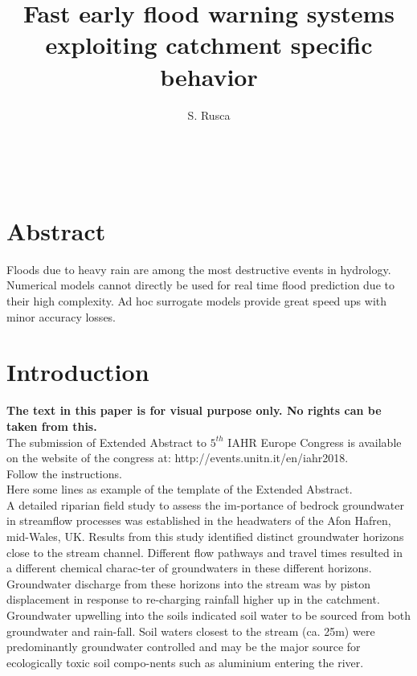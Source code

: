 \documentclass[12pt,a4paper,twocolumn,fleqn]{narms}
\begin{document}
\title{Fast early flood warning systems exploiting catchment specific behavior}
\author{{S. Rusca} \\
{} \\\\
{}\\
{}
} \maketitle


\section*{Abstract}

Floods due to heavy rain are among the most destructive events in hydrology. 
Numerical models cannot directly be used for real time flood prediction due to
their high complexity. Ad hoc surrogate models provide great speed
ups with minor accuracy losses.


\section{Introduction}

{\bf The text in this paper is for visual purpose only. No rights
can be taken from this.}\\

The submission of Extended Abstract to $5^{th}$ IAHR Europe Congress
is available on the website of the congress at: http://events.unitn.it/en/iahr2018.\\

Follow the instructions.\\

Here some lines as example of the template of the Extended Abstract.\\

A detailed riparian field study to assess the im-portance of
bedrock groundwater in streamflow processes was established in the
headwaters of the Afon Hafren, mid-Wales, UK. Results from this
study identified distinct groundwater horizons close to the stream
channel.  Different flow pathways and travel times resulted in a
different chemical charac-ter of groundwaters in these different
horizons.  Groundwater discharge from these horizons into the
stream was by piston displacement in response to re-charging
rainfall higher up in the catchment.  Groundwater upwelling into
the soils indicated soil water to be sourced from both groundwater
and rain-fall.  Soil waters closest to the stream (ca. 25m) were
predominantly groundwater controlled and may be the major source
for ecologically toxic soil compo-nents such as aluminium entering
the river.
\end{document}
